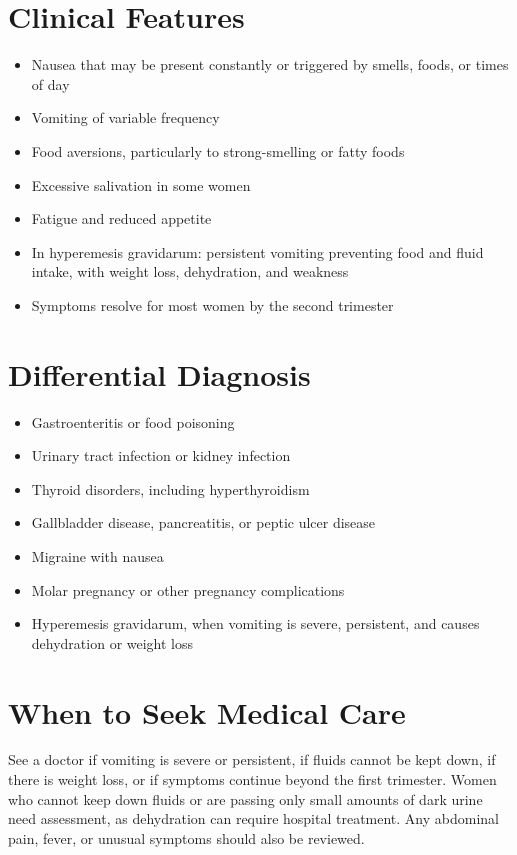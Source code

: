 \section*{Clinical Features}
\begin{itemize}
    \item Nausea that may be present constantly or triggered by smells, foods, or times of day
    \item Vomiting of variable frequency
    \item Food aversions, particularly to strong-smelling or fatty foods
    \item Excessive salivation in some women
    \item Fatigue and reduced appetite
    \item In hyperemesis gravidarum: persistent vomiting preventing food and fluid intake, with weight loss, dehydration, and weakness
    \item Symptoms resolve for most women by the second trimester
\end{itemize}

\section*{Differential Diagnosis}
\begin{itemize}
    \item Gastroenteritis or food poisoning
    \item Urinary tract infection or kidney infection
    \item Thyroid disorders, including hyperthyroidism
    \item Gallbladder disease, pancreatitis, or peptic ulcer disease
    \item Migraine with nausea
    \item Molar pregnancy or other pregnancy complications
    \item Hyperemesis gravidarum, when vomiting is severe, persistent, and causes dehydration or weight loss
\end{itemize}

\section*{When to Seek Medical Care}
See a doctor if vomiting is severe or persistent, if fluids cannot be kept down, if there is weight loss, or if symptoms continue beyond the first trimester. Women who cannot keep down fluids or are passing only small amounts of dark urine need assessment, as dehydration can require hospital treatment. Any abdominal pain, fever, or unusual symptoms should also be reviewed.

